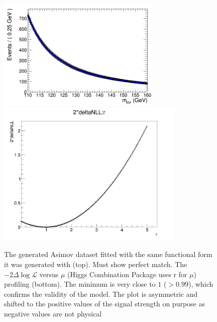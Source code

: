 \begin{figure}[htbp]
     \centering
     \includegraphics[width=0.7\textwidth]{figures/combine/asimovTests/cat6_x_fit_b.png}\\
     \includegraphics[width=0.8\textwidth]{figures/combine/asimovTests/NLL_asimovTest_p25GeV.png}
     \caption{The generated Asimov dataset fitted with the same functional form it was generated with (top). Must show perfect match. The $-2\Delta\log{\mathcal{L}}$ versus $\mu$ (Higgs Combination Package uses r for $\mu$) profiling (bottom). The minimum is very close to $1$ ($> 0.99$), which confirms the validity of the model. The plot is asymmetric and shifted to the positive values of the signal strength on purpose as negative values are not physical}
     \label{fig:higgs_combination_asimovtests}
 \end{figure}


